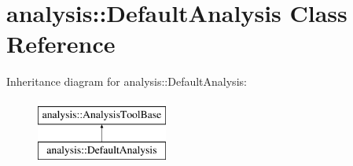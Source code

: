 \hypertarget{classanalysis_1_1DefaultAnalysis}{}\section{analysis\+:\+:Default\+Analysis Class Reference}
\label{classanalysis_1_1DefaultAnalysis}
Inheritance diagram for analysis\+:\+:Default\+Analysis\+:\begin{figure}[H]
\begin{center}
\leavevmode
\includegraphics[height=2.000000cm]{classanalysis_1_1DefaultAnalysis}
\end{center}
\end{figure}
